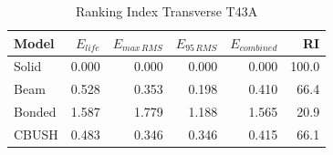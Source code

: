 \begin{table}[H]
    \centering
    \caption{Ranking Index Transverse T43A}
    \label{tab:RI_table_HorizontalT43A}
    \begin{tabular}{lrrrrr}
        \toprule
        \textbf{Model}  & \textbf{$E_{life}$} & \textbf{$E_{max\, RMS}$} & \textbf{$E_{95\, RMS}$} & \textbf{$E_{combined}$} & \textbf{RI} \\
        \midrule
        Solid  & 0.000 & 0.000 & 0.000 & 0.000 & 100.0 \\
        Beam  & 0.528 & 0.353 & 0.198 & 0.410 & 66.4 \\
        Bonded  & 1.587 & 1.779 & 1.188 & 1.565 & 20.9 \\
        CBUSH  & 0.483 & 0.346 & 0.346 & 0.415 & 66.1 \\
        \bottomrule
    \end{tabular}
\end{table}
